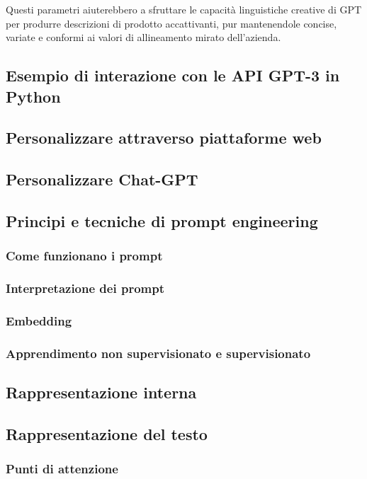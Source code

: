         Questi parametri aiuterebbero a sfruttare le capacità linguistiche creative di GPT per produrre descrizioni di prodotto accattivanti, pur mantenendole concise, variate e conformi ai valori di allineamento mirato dell'azienda.
        
    \subsection{Esempio di interazione con le API GPT-3 in Python}
        
    \subsection{Personalizzare attraverso piattaforme web}
    \subsection{Personalizzare Chat-GPT}
    \subsection{Principi e tecniche di prompt engineering}
        \subsubsection{Come funzionano i prompt}
        \subsubsection{Interpretazione dei prompt}
        \subsubsection{Embedding}
        \subsubsection{Apprendimento non supervisionato e supervisionato}
    \subsection{Rappresentazione interna}
    \subsection{Rappresentazione del testo}
        \subsubsection{Punti di attenzione}
